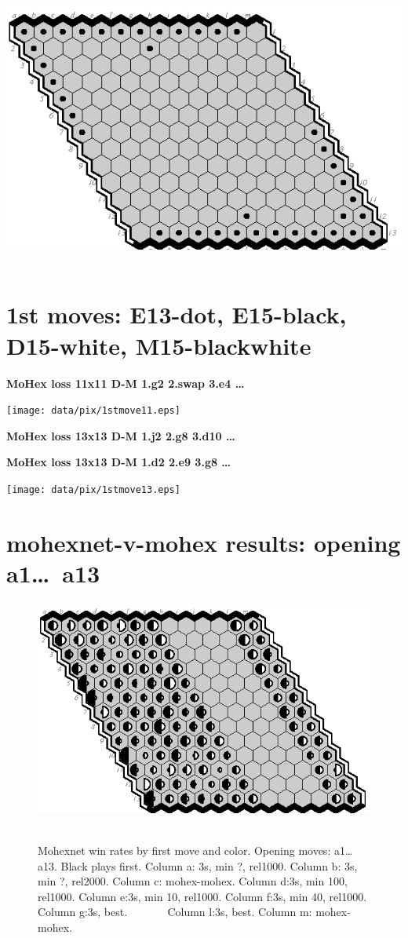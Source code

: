 \documentclass{article}
\begin{document}
\includegraphics[scale=2]{data/pix/swaps13.eps}\vfill\vfill\vfill~
\newpage
\section*{1st moves: E13-dot, E15-black, D15-white, M15-blackwhite}
\vfill

{\large\bf MoHex loss 11x11 D-M 1.g2 2.swap 3.e4 \ldots}
\vfill\vfill

\texttt{[image: data/pix/1stmove11.eps]}\vfill\vfill

{\large\bf MoHex loss 13x13 D-M 1.j2 2.g8 3.d10 \ldots}

{\large\bf MoHex loss 13x13 D-M 1.d2 2.e9 3.g8 \ldots}
\vfill

\texttt{[image: data/pix/1stmove13.eps]}\vfill\vfill\vfill~
\newpage
\section*{mohexnet-v-mohex results: opening a1\ldots\ a13}
\begin{figure}[hb]
\includegraphics[scale=2]{data/pix2/mnt-mx.eps}\vfill\vfill\vfill~
\caption{Mohexnet win rates by first move and color. Opening moves: a1\ldots a13. Black plays first. 
Column a: 3s, min ?, rel1000.
Column b: 3s, min ?, rel2000. 
Column c: mohex-mohex. 
Column d:3s, min 100, rel1000.
Column e:3s, min 10, rel1000. 
Column f:3s, min 40, rel1000.
Column g:3s, best. ~ ~ ~ ~ 
Column l:3s, best.
Column m: mohex-mohex.}
\end{figure}
\end{document}
